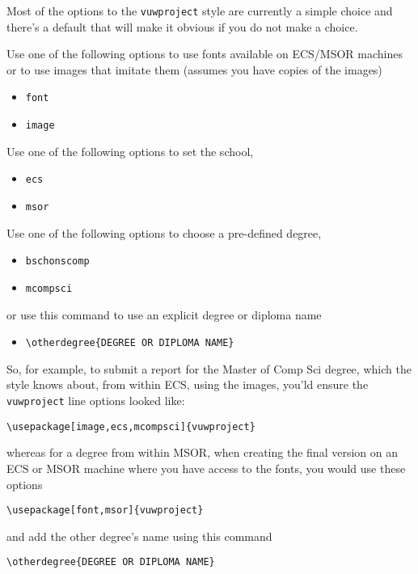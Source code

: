 Most of the options to the \texttt{vuwproject} style are currently a simple
choice and there's a default that will make it obvious if you do not make
a choice.

Use one of the following options to use fonts available on ECS/MSOR machines
or to use images that imitate them (assumes you have copies of the images)
\begin{itemize}
\item \verb+font+
\item \verb+image+
\end{itemize}

Use one of the following options to set the school,
\begin{itemize}
\item \verb+ecs+
\item \verb+msor+
\end{itemize}

Use one of the following options to choose a pre-defined degree,
\begin{itemize}
\item \verb+bschonscomp+
\item \verb+mcompsci+
\end{itemize}

or use this command to use an explicit degree or diploma name
\begin{itemize}
\item \verb+\otherdegree{DEGREE OR DIPLOMA NAME}+
\end{itemize}

So, for example, to submit a report for the Master of Comp Sci degree, which
the style knows about, from within ECS, using the images, you'ld ensure the
 \texttt{vuwproject} line options looked like:

\begin{verbatim}
\usepackage[image,ecs,mcompsci]{vuwproject}
\end{verbatim}

whereas for a degree from within MSOR, when creating the final version on
an ECS or MSOR machine where you have access to the fonts, you would use
these options

\begin{verbatim}
\usepackage[font,msor]{vuwproject}
\end{verbatim}


and add the other degree's name using this command 

\begin{verbatim}
\otherdegree{DEGREE OR DIPLOMA NAME}
\end{verbatim}

